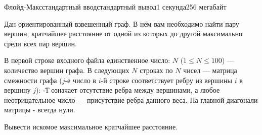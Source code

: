 \begin{problem}{Флойд-Макс}{стандартный ввод}{стандартный вывод}{1 секунда}{256 мегабайт}

Дан ориентированный взвешенный граф. В нём вам необходимо найти пару вершин, кратчайшее расстояние от одной из которых до другой максимально среди всех пар вершин.

\InputFile
В первой строке входного файла единственное число: $N$ ($1 \le N \le 100$) --- количество вершин графа. В следующих $N$ строках по $N$ чисел --- матрица смежности графа ($j$-е число в $i$-й строке соответствует ребру из вершины $i$ в вершину $j$): \t{-1} означает отсутствие ребра между вершинами, а любое неотрицательное число --- присутствие ребра данного веса. На главной диагонали матрицы - всегда нули. 

\OutputFile
Вывести искомое максимальное кратчайшее расстояние. 


\Example

\begin{example}
%
\end{example}

\end{problem}

